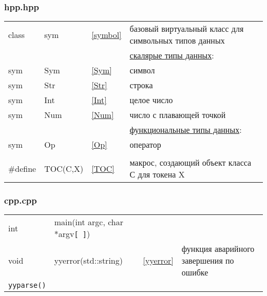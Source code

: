 \subsubsection{hpp.hpp}

\begin{tabular}{l l l l}
class & sym & \ref{symbol} &
базовый виртуальный класс для символьных типов данных \\
&&&\underline{скалярые типы данных}:\\
sym & Sym & \ref{Sym} & символ \\
sym & Str & \ref{Str} & строка \\
sym & Int & \ref{Int} & целое число \\
sym & Num & \ref{Num} & число с плавающей точкой \\
&&&\underline{функциональные типы данных}:\\
sym & Op & \ref{Op} & оператор \\
&&&\\
\#define & TOC(C,X) & \ref{TOC} & макрос, создающий объект класса С для токена X \\
\end{tabular}

\subsubsection{cpp.cpp}

\begin{tabular}{l l l l}
int & main(int argc, char *argv\verb|[ ]|) &&\\
void & yyerror(std::string) & \ref{yyerror} &
функция аварийного завершения по ошибке \\
\hline
\verb|yyparse()|\\
\end{tabular}



\secup